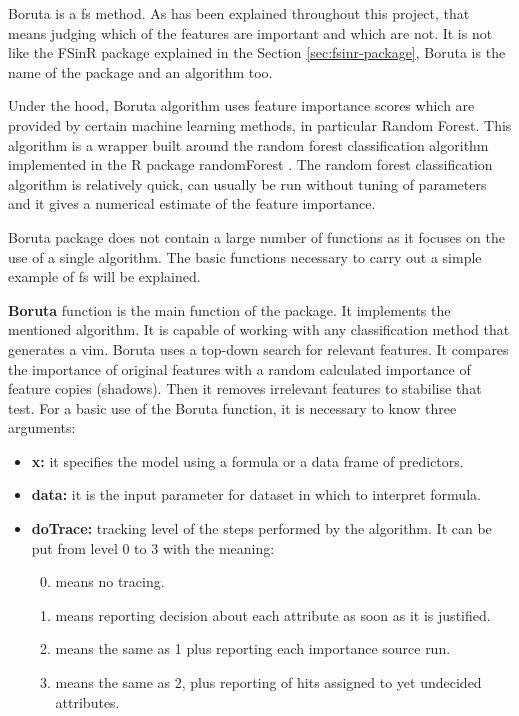 Boruta is a \acrshort{fs} method. As has been explained throughout this project, that means judging which of the features are important and which are not. It is not like the FSinR package explained in the Section \ref{sec:fsinr-package}, Boruta is the name of the package and an algorithm too.

Under the hood, Boruta algorithm \cite{Boruta} uses feature importance scores which are provided by certain machine learning methods, in particular Random Forest. This algorithm is a wrapper built around the random forest classification algorithm implemented in the R package randomForest \cite{randomForest}. The random forest classification algorithm is relatively quick, can usually be run without tuning of parameters and it gives a numerical estimate of the feature importance.

Boruta package does not contain a large number of functions as it focuses on the use of a single algorithm. The basic functions necessary to carry out a simple example of \acrshort{fs} will be explained.

\textbf{Boruta} function is the main function of the package. It implements the mentioned algorithm. It is capable of working with any classification method that generates a \acrfull{vim}. Boruta uses a top-down search for relevant features. It compares the importance of original features with a random calculated importance of feature copies (shadows). Then it removes irrelevant features to stabilise that test. For a basic use of the Boruta function, it is necessary to know three arguments:

\begin{itemize}
    \item \textbf{x:} it specifies the model using a formula or a data frame of predictors.
    
    \item \textbf{data:} it is the input parameter for dataset in which to interpret formula.
    
    \item \textbf{doTrace:} tracking level of the steps performed by the algorithm. It can be put from level 0 to 3 with the meaning:
    
    \begin{enumerate}
        \setcounter{enumi}{-1}
        \item means no tracing.
        \item means reporting decision about each attribute as soon as it is justified.
        \item means the same as 1 plus reporting each importance source run.
        \item  means the same as 2, plus reporting of hits assigned to yet undecided attributes.
    \end{enumerate}
\end{itemize}

